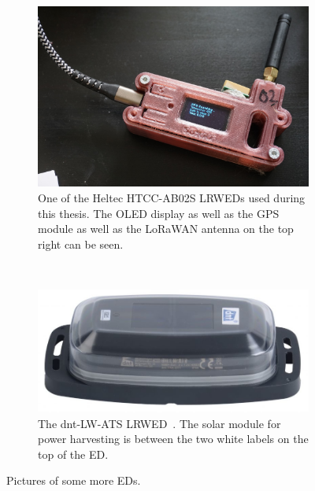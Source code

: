 \begin{figure}
    \centering

    \begin{subfigure}[t]{0.5\textwidth}
        \centering
        \includegraphics[width=1\textwidth]{pictures/hardware/gps-nodes/HTCC-AB02S.jpg}
        \caption{
            One of the Heltec HTCC-AB02S \aclp{LRWED} used during this thesis.
            The \acs{OLED} display as well as the \ac{GPS} module as well as the \ac{LoRaWAN} antenna on the top right can be seen.
        }\label{pic:heltec-htcc-ab02s}
    \end{subfigure}%
    ~
    \begin{subfigure}[t]{0.5\textwidth}
        \centering
        \includegraphics[width=1\textwidth]{pictures/hardware/gps-nodes/dnt-LW-ATS.jpg}
        \caption{
            The dnt-LW-ATS \acl{LRWED}~\protect\cite{dnt_gmbh_dnt_nodate}.
            The solar module for power harvesting is between the two white labels on the top of the \acl{ED}.
        }\label{pic:dnt-lw-ats}
    \end{subfigure}

    \caption{Pictures of some more \aclp{ED}.}
\end{figure}

